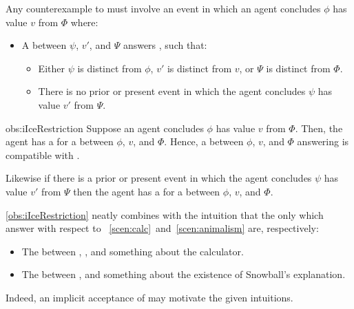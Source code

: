 \begin{note}
  \begin{observation}%
    \label{obs:iIceRestriction}%
    Any counterexample to \issueInclusion{} must involve an event in which an agent concludes \(\phi\) has value \(v\) from \(\Phi\) where:
    \begin{itemize}
    \item
      A \ros{} between \(\psi\), \(v'\), and \(\Psi\) answers \qWhy{}, such that:
      \begin{itemize}
      \item
        Either \(\psi\) is distinct from \(\phi\), \(v'\) is distinct from \(v\), or \(\Psi\) is distinct from \(\Phi\).
      \item
        There is no prior or present event in which the agent concludes \(\psi\) has value \(v'\) from \(\Psi\).
      \end{itemize}
    \end{itemize}
    \vspace{-1.5\baselineskip}
  \end{observation}
  \begin{motivation}{obs:iIceRestriction}
    Suppose an agent concludes \(\phi\) has value \(v\) from \(\Phi\).
    Then, the agent has a \wit{} for a \ros{} between \(\phi\), \(v\), and \(\Phi\).
    Hence, a \ros{} between \(\phi\), \(v\), and \(\Phi\) answering \qWhy{} is compatible with \issueInclusion{}.

    Likewise if there is a prior or present event in which the agent concludes \(\psi\) has value \(v'\) from \(\Psi\) then the agent has a \wit{} for a \ros{} between \(\phi\), \(v\), and \(\Phi\).
  \end{motivation}

  \autoref{obs:iIceRestriction} neatly combines with the intuition that the only  which answer \qWhy{} with respect to ~\ref{scen:calc}~and~\ref{scen:animalism} are, respectively:
  \begin{itemize}
  \item
    The \ros{} between \propM{\gistCalcEq{}}, , and something about the calculator.
  \item
    The \ros{} between ,  and something about the existence of Snowball's explanation.
  \end{itemize}
  Indeed, an implicit acceptance of \issueInclusion{} may motivate the given intuitions.
\end{note}

